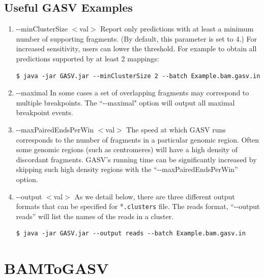 \documentclass[11pt]{article}
\begin{document}
\subsection{Useful GASV Examples} 
\begin{enumerate}

\item -{}-minClusterSize $<$val$>$
Report only predictions with at least a minimum number of supporting 
fragments. (By default, this parameter is set to 4.) For increased sensitivity, users can lower the threshold. For example to obtain all predictions supported by at least 2 mappings:

\begin{framed}
{ \small
\begin{Verbatim}
$ java -jar GASV.jar --minClusterSize 2 --batch Example.bam.gasv.in
\end{Verbatim}
}
\end{framed}

\item -{}-maximal
In some cases a set of overlapping fragments may correspond to 
multiple breakpoints. The ``-{}-maximal" option will output 
all maximal breakpoint events.

\item -{}-maxPairedEndsPerWin $<$val$>$
The speed at which GASV runs corresponds to the number of fragments in 
a particular genomic region. Often some genomic regions (such as centromeres) 
will have a high density of discordant fragments. GASV's running time
can be significantly increased by skipping such high density regions with 
the ``-{}-maxPairedEndsPerWin'' option.

\item -{}-output $<$val$>$
As we detail below, there are three different output formats
that can be specified for *\verb+.clusters+ file. The reads format, ``-{}-output reads'' 
will list the names of the reads in a cluster. 

\begin{framed}
{\small
\begin{Verbatim}
$ java -jar GASV.jar --output reads --batch Example.bam.gasv.in
\end{Verbatim}
}
\end{framed}

\end{enumerate}

\clearpage
\section{BAMToGASV}
\end{document}
